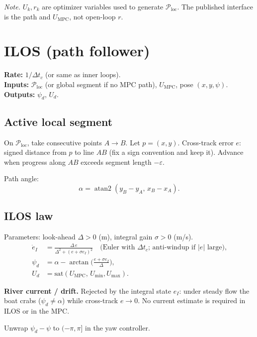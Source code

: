\documentclass[11pt,a4paper]{article}
\begin{document}
\noindent\textit{Note.}
\(U_k,r_k\) are optimizer variables used to generate \(\mathcal{P}_{\mathrm{loc}}\).
The published interface is the path and \(U_{\mathrm{MPC}}\), not open-loop \(r\).

\section{ILOS (path follower)}

\textbf{Rate:} \(1/\Delta t_c\) (or same as inner loops).\\
\textbf{Inputs:} \(\mathcal{P}_{\mathrm{loc}}\) (or global segment if no MPC path),
\(U_{\mathrm{MPC}}\), pose \((x,y,\psi)\).\\
\textbf{Outputs:} \(\psi_d,\, U_d\).

\subsection{Active local segment}
On \(\mathcal{P}_{\mathrm{loc}}\), take consecutive points \(A\to B\).
Let \(p=(x,y)\).
Cross-track error \(e\): signed distance from \(p\) to line \(AB\)
(fix a sign convention and keep it).
Advance when progress along \(AB\) exceeds segment length \(-\varepsilon\).

Path angle:
\[
\alpha=\operatorname{atan2}(y_B-y_A,\, x_B-x_A).
\]

\subsection{ILOS law}
Parameters: look-ahead \(\Delta>0\) (m), integral gain \(\sigma>0\) (m/s).
\[
\begin{aligned}
\dot e_I
  &= \frac{\Delta\, e}{\Delta^2+(e+\sigma e_I)^2}
  \quad\text{(Euler with \(\Delta t_c\); anti-windup if \(|e|\) large),} \\
\psi_d
  &= \alpha - \arctan\!\Big(\frac{e+\sigma e_I}{\Delta}\Big), \\
U_d
  &= \mathrm{sat}(U_{\mathrm{MPC}},\, U_{\min},U_{\max}).
\end{aligned}
\]

\textbf{River current / drift.}
Rejected by the integral state \(e_I\): under steady flow the boat crabs
(\(\psi_d\neq\alpha\)) while cross-track \(e\to 0\).
No current estimate is required in ILOS or in the MPC.

Unwrap \(\psi_d-\psi\) to \((-\pi,\pi]\) in the yaw controller.
\end{document}
